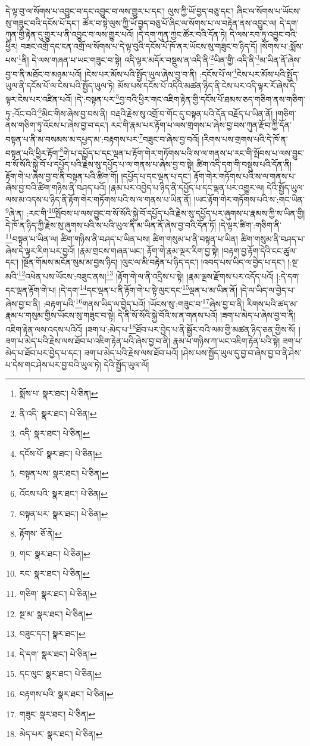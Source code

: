དེ་ལྟ་བུ་ལ་སོགས་པ་འབྱུང་བ་དང་འབྱུང་བ་ལས་གྱུར་པ་དང་། ལུས་ཀྱི་ཡོ་བྱད་བཅུ་དང་། ཞིང་ལ་སོགས་པ་ཡོངས་སུ་གཟུང་བའི་དངོས་པོ་དང་། ཚོར་བ་སྟེ་ལུས་ཀྱི་ཡོ་བྱད་བཅུ་པོ་ཞིང་ལ་སོགས་པ་ལ་བརྟེན་ནས་འབྱུང་ལ། དེ་དག་ཀུན་གྱི་རྟེན་དུ་གྱུར་པ་ནི་འབྱུང་བ་ལས་གྱུར་པའོ། །དེ་དག་ཀུན་ཀྱང་ཚོར་བའི་དོན་ཏེ། དེ་ལས་རབ་ཏུ་འབྱུང་བའི་ཕྱིར། བཟང་འགྲོ་དང་ངན་འགྲོ་ལ་སོགས་པ་དེ་ལྟ་བུའི་དངོས་པོ་ཁོ་ནར་ཡོངས་སུ་གཟུང་བ་ཉིད་དོ། །སོགས་པ་:སྨོས་པས་\footnote{སྨོས་པ་  སྣར་ཐང་།  པེ་ཅིན། }ནི། དེ་ལས་གཞན་པ་ཡང་གཟུང་བ་སྟེ། འདི་ལྟར་མདོར་བསྡུས་ན་འདི་ནི་\footnote{ནི་འདི་  སྣར་ཐང་།  པེ་ཅིན། }ཡིན་གྱི་:འདི་ནི་\footnote{འདི་  སྣར་ཐང་།  པེ་ཅིན། }མ་ཡིན་ནོ་ཞེས་བྱ་བ་ནི་མཐོང་བ་མཉམ་པའོ། །ངེས་པར་མོས་པའི་སྤྱོད་ཡུལ་ཞེས་བྱ་བ་ནི། :དངོས་པོ་ལ་\footnote{དངོས་པོ་  སྣར་ཐང་།  པེ་ཅིན། }ངེས་པར་མོས་པའི་སྤྱོད་ཡུལ་ནི་དངོས་པོ་ལ་ངེས་པའི་སྤྱོད་ཡུལ་ཏེ། མོས་པས་དངོས་པོ་འདིའི་མཚན་ཉིད་ནི་ངེས་པར་འདི་ལྟར་རོ་ཞེས་དེ་ལྟར་ངེས་པར་འཛིན་པའོ། །དེ་:བསྟན་པར་\footnote{བསྟན་པས་  སྣར་ཐང་།  པེ་ཅིན། }བྱ་བའི་ཕྱིར་གང་འཇིག་རྟེན་གྱི་དངོས་པོ་ཐམས་ཅད་གཅིག་ནས་གཅིག་ཏུ་:འོང་བའི་\footnote{འོངས་པའི་  སྣར་ཐང་།  པེ་ཅིན། }མིང་གིས་ཞེས་བྱ་བས་ནི། བརྡའི་རྗེས་སུ་འགྲོ་བ་གོང་དུ་བསྟན་པའི་དོན་བརྗོད་པ་ཡིན་ནོ། །གཅིག་ནས་གཅིག་ཏུ་འོངས་པ་ཞེས་བྱ་བ་དང་། རང་གི་རྣམ་པར་རྟོག་པ་ལས་གྲགས་པ་ཞེས་བྱ་བས་ཀུན་རྫོབ་ཀྱི་དོན་བསྟན་པ་ནི་མ་བསམས་མ་དཔྱད་མ་:བརྟགས་པར་\footnote{བསྟན་པར་  སྣར་ཐང་།  པེ་ཅིན། }བཟུང་བ་ཞེས་བྱ་བའོ། །རིགས་པས་གྲགས་པའི་དེ་ཁོ་ན་བསྟན་པའི་ཕྱིར་རྟོག་\footnote{རྟོགས་  ཅོ་ནེ། }གེ་པ་དཔྱོད་པ་དང་ལྡན་པ་རྟོག་གེར་གཏོགས་པའི་ས་ལ་གནས་པ་རང་གི་སྤོབས་པ་ལས་བྱུང་བ་སོ་སོའི་སྐྱེ་བོ་པ་དཔྱོད་པའི་རྗེས་སུ་དཔྱོད་པ་ལ་གནས་པ་ཞེས་བྱ་བ་སྟེ། ཚིག་འདི་དག་གི་བསྡུས་པའི་དོན་ནི། རྟོག་གེ་པ་ཞེས་བྱ་བ་ནི་བསྟན་པའི་ཚིག་གོ། །དཔྱོད་པ་དང་ལྡན་པ་དང་། རྟོག་གེར་གཏོགས་པའི་ས་ལ་གནས་པ་ཞེས་བྱ་བའི་ཚིག་གཉིས་ནི་བཤད་པའོ། །རྣམ་པར་འབྱེད་པ་ཉིད་ནི་དཔྱོད་པ་དང་ལྡན་པར་འགྱུར་ལ། དེའི་སྤྱོད་ཡུལ་ལས་མ་འདས་པ་ཉིད་ནི་རྟོག་གེར་གཏོགས་པའི་ས་ལ་གནས་པ་ཡིན་ནོ། །ཡང་རྟོག་གེར་གཏོགས་པའི་ས་:གང་ཡིན་\footnote{གང་  སྣར་ཐང་།  པེ་ཅིན། }ཞེ་ན། :རང་གི་\footnote{རང་  སྣར་ཐང་།  པེ་ཅིན། }སྤོབས་པ་ལས་བྱུང་བ་སོ་སོའི་སྐྱེ་བོ་དཔྱོད་པའི་རྗེས་སུ་དཔྱོད་པར་ཞུགས་པ་རྣམས་ཀྱི་ས་ཡིན་གྱི། དེ་ཁོ་ན་ཉིད་ཀྱི་རྗེས་སུ་ཞུགས་པའི་ས་པའི་ཡུལ་ནི་མ་ཡིན་ནོ་ཞེས་བྱ་བའི་དོན་ཏོ། །དེ་ལྟར་ཚིག་:གཅིག་ནི་\footnote{གཅིག་  སྣར་ཐང་།  པེ་ཅིན། }བསྟན་པ་ཡིན་ལ། ཚིག་གཉིས་ནི་བཤད་པ་ཡིན་པས། ཚིག་གསུམ་པ་ནི་བསྟན་པ་ཡིན། ཚིག་གསུམ་ནི་བཤད་པ་ཞེས་དེ་ལྟར་རིག་པར་བྱའོ། །རྣམ་གྲངས་གཞན་ཡང་། རྟོག་གེ་རྣམ་ལྔར་རིག་བྱ་སྟེ། །བརྟག་བྱ་རྟོག་དེའི་ངང་ཚུལ་དང་། །སྔོན་གོམས་མངོན་སུམ་མ་བྱས་ཉིད། །ལུང་ལ་མི་བརྟེན་པ་ཉིད་དང་། །འབད་པས་ཡིད་ལ་བྱེད་པ་དང་། །:སྔ་མའི་\footnote{སྔ་མ་  སྣར་ཐང་།  པེ་ཅིན། }འཕེན་པས་ཡོངས་:བཟུང་ནས།\footnote{བཟུང་དང་།  སྣར་ཐང་། } །རྟོག་གེ་ལ་ནི་འདྲིས་པ་སྟེ། །རྣམ་ལྔས་རྫོགས་པར་འདོད་པའོ། །:དེ་དག་དང་ལྡན་རྟོག་གེ་པ། །དེ་དག་\footnote{དེ་དག་  སྣར་ཐང་།  པེ་ཅིན། }དང་ལྡན་པ་ནི་རྟོག་གེ་པ་སྟེ་ལུང་དང་\footnote{དང་ལུང་  སྣར་ཐང་།  པེ་ཅིན། }ལྡན་པ་མ་ཡིན་ནོ། །དེ་ལ་ཡིད་ལ་བྱེད་པ་ཞེས་བྱ་བ་ནི། :བརྟག་པའི་\footnote{བརྟགས་པའི་  སྣར་ཐང་།  པེ་ཅིན། }གནས་ཡིད་ལ་བྱེད་པའོ། །ཡོངས་སུ་:གཟུང་བ་\footnote{གཟུང་  སྣར་ཐང་།  པེ་ཅིན། }ཞེས་བྱ་བ་ནི། རིགས་པའི་ཚད་མ་རྣམ་པ་གསུམ་གྱིས་ཡོངས་སུ་གཟུང་བ་སྟེ། དེ་ནི་སོ་སོའི་སྐྱེ་བོའི་ས་ན་གནས་པའོ། །ཟག་པ་མེད་པ་ཞེས་བྱ་བ་ནི། འཇིག་རྟེན་ལས་འདས་པའིའོ། །ཟག་པ་:མེད་པ་\footnote{མེད་པར་  སྣར་ཐང་།  པེ་ཅིན། }ཐོབ་པར་བྱེད་པ་ནི་སྦྱོར་བའི་ལམ་གྱི་མཚན་ཉིད་ཅན་གྱིས་སོ། །ཟག་པ་མེད་པའི་རྗེས་ལས་ཐོབ་པ་འཇིག་རྟེན་པའི་ཞེས་བྱ་བ་ནི། རྣམ་པ་གཉིས་ཀ་ཡང་འཇིག་རྟེན་པའི་སྟེ། ཟག་པ་མེད་པ་ཐོབ་པར་བྱེད་པ་དང་། ཟག་པ་མེད་པའི་རྗེས་ལས་ཐོབ་པའོ། །ཤེས་པས་སྤྱོད་ཡུལ་དུ་བྱ་བ་ཞེས་བྱ་བ་ནི་ཤེས་པ་དེས་གང་ཤེས་པར་བྱ་བའི་ཡུལ་ཏེ། དེའི་སྤྱོད་ཡུལ་ལོ། 